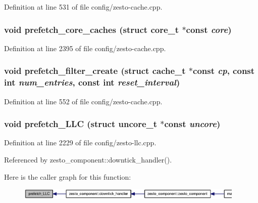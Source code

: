 Definition at line 531 of file config/zesto-cache.cpp.
\subsubsection[{prefetch\_\-core\_\-caches}]{\setlength{\rightskip}{0pt plus 5cm}void prefetch\_\-core\_\-caches (struct {\bf core\_\-t} $\ast$const  {\em core})}\label{config_2zesto-cache_8h_3f3ef48df254425f422f6cf5de128ade}




Definition at line 2395 of file config/zesto-cache.cpp.
\subsubsection[{prefetch\_\-filter\_\-create}]{\setlength{\rightskip}{0pt plus 5cm}void prefetch\_\-filter\_\-create (struct {\bf cache\_\-t} $\ast$const  {\em cp}, \/  const int {\em num\_\-entries}, \/  const int {\em reset\_\-interval})}\label{config_2zesto-cache_8h_81be4d7fbc22a3d9f3fcaa52715c22e9}




Definition at line 552 of file config/zesto-cache.cpp.
\subsubsection[{prefetch\_\-LLC}]{\setlength{\rightskip}{0pt plus 5cm}void prefetch\_\-LLC (struct {\bf uncore\_\-t} $\ast$const  {\em uncore})}\label{config_2zesto-cache_8h_8ed5f90d7b07bddefbf6736b13da8eb2}




Definition at line 2229 of file config/zesto-llc.cpp.

Referenced by zesto\_\-component::downtick\_\-handler().

Here is the caller graph for this function:\nopagebreak
\begin{figure}[H]
\begin{center}
\leavevmode
\includegraphics[width=308pt]{config_2zesto-cache_8h_8ed5f90d7b07bddefbf6736b13da8eb2_icgraph}
\end{center}
\end{figure}

